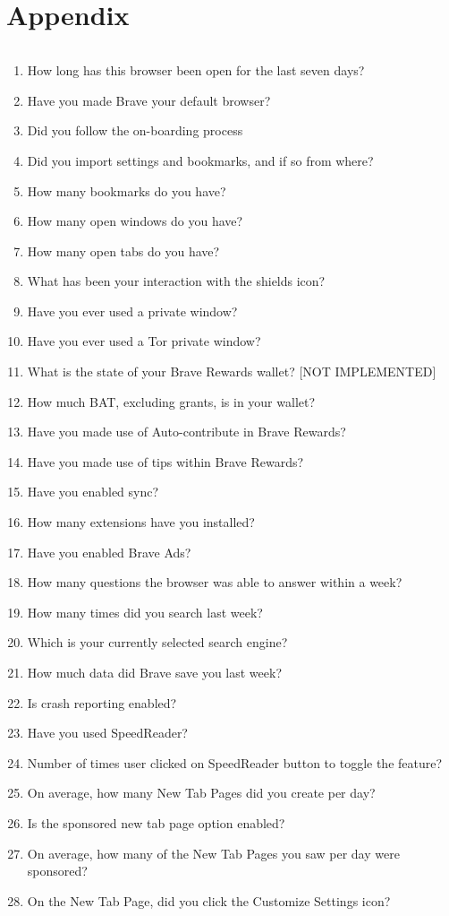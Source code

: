 \chapter{Appendix}
\label{chap:appendix}

\begin{lstlisting}[label=lst:brave-report, caption=Brave Browser telemetry questions]
\end{lstlisting}
\begin{enumerate}
    \label{list:brave_question}
    \item How long has this browser been open for the last seven days?
    \item Have you made Brave your default browser?
    \item Did you follow the on-boarding process
    \item Did you import settings and bookmarks, and if so from where?
    \item How many bookmarks do you have?
    \item How many open windows do you have?
    \item How many open tabs do you have?
    \item What has been your interaction with the shields icon?
    \item Have you ever used a private window?
    \item Have you ever used a Tor private window?
    \item What is the state of your Brave Rewards wallet? [NOT IMPLEMENTED]
    \item How much BAT, excluding grants, is in your wallet?
    \item  Have you made use of Auto-contribute in Brave Rewards?
    \item Have you made use of tips within Brave Rewards?
    \item Have you enabled sync?
    \item How many extensions have you installed?
    \item Have you enabled Brave Ads?
    \item How many questions the browser was able to answer within a week?
    \item How many times did you search last week?
    \item Which is your currently selected search engine?
    \item How much data did Brave save you last week?
    \item Is crash reporting enabled?
    \item Have you used SpeedReader?
    \item Number of times user clicked on SpeedReader button to toggle the feature?
    \item On average, how many New Tab Pages did you create per day?
    \item Is the sponsored new tab page option enabled?
    \item On average, how many of the New Tab Pages you saw per day were sponsored?
    \item On the New Tab Page, did you click the Customize Settings icon?
\end{enumerate}



